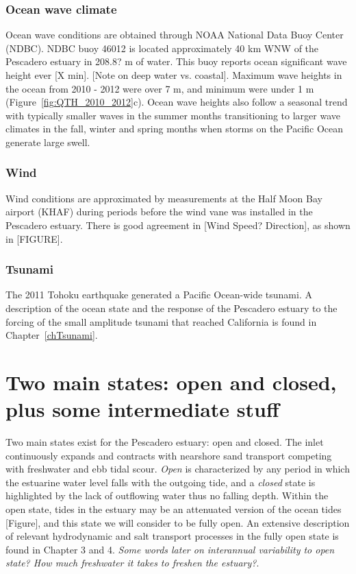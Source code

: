 \subsubsection{Ocean wave climate}
Ocean wave conditions are obtained through NOAA National
Data Buoy Center (NDBC). NDBC buoy 46012 is located approximately 40 km
WNW of the Pescadero estuary in 208.8? m of water. This buoy reports
ocean significant wave height ever [X min]. [Note on deep water vs.
coastal]. Maximum wave heights in the ocean from 2010 - 2012 were over 7 m,
and minimum were under 1 m (Figure~\ref{fig:QTH_2010_2012}c). Ocean wave heights also follow a seasonal trend with typically smaller waves in the summer months transitioning to larger wave climates in the fall, winter and spring months when storms on the Pacific Ocean generate large swell.

\subsubsection{Wind}
Wind conditions are approximated by measurements at the Half Moon Bay airport (KHAF) during periods before the wind vane was installed in the Pescadero estuary.  There is good agreement in [Wind Speed? Direction], as shown in [FIGURE].

\subsubsection{Tsunami}
The 2011 Tohoku earthquake generated a Pacific Ocean-wide tsunami. A description of the ocean state and the response of the Pescadero estuary to the forcing of the small amplitude tsunami that reached California is found in Chapter~\ref{chTsunami}.



\section{Two main states: open and closed, plus some intermediate stuff}
\label{betterlabelmaybe}

Two main states exist for the Pescadero estuary: open and closed.  The inlet continuously expands and contracts with nearshore sand transport competing with freshwater and ebb tidal scour. \emph{Open} is characterized by any period in which the estuarine water level falls with the outgoing tide, and a \emph{closed} state is highlighted by the lack of outflowing water thus no falling depth. Within the open state, tides in the estuary may be an attenuated version of the ocean tides [Figure], and this state we will consider to be fully open. An extensive description of relevant hydrodynamic and salt transport processes in the fully open state is found in Chapter 3 and 4. \emph{Some words later on interannual variability to open state? How much freshwater it takes to freshen the estuary?}.

